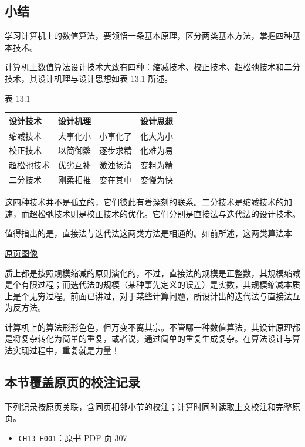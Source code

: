 \documentclass[
  10pt,
  fontset=fandol]{ctexart}
\newcounter{none} %
\providecommand{\tightlist}{%
  \setlength{\itemsep}{0pt}\setlength{\parskip}{0pt}}
\begin{document}
\subsection{小结}\label{ux5c0fux7ed3}

学习计算机上的数值算法，要领悟一条基本原理，区分两类基本方法，掌握四种基本技术。

计算机上数值算法设计技术大致有四种：缩减技术、校正技术、超松弛技术和二分技术，其设计机理与设计思想如表 13.1 所述。

表 13.1

{\def\LTcaptype{none} %
\begin{longtable}[]{@{}lll@{}}
\toprule\noalign{}
设计技术 & 设计机理 & 设计思想 \\
\midrule\noalign{}
\endhead
\bottomrule\noalign{}
\endlastfoot
缩减技术 & 大事化小　小事化了 & 化大为小 \\
校正技术 & 以简御繁　逐步求精 & 化难为易 \\
超松弛技术 & 优劣互补　激浊扬清 & 变粗为精 \\
二分技术 & 刚柔相推　变在其中 & 变慢为快 \\
\end{longtable}
}

这四种技术并不是孤立的，它们彼此有着深刻的联系。二分技术是缩减技术的加速，而超松弛技术则是校正技术的优化。它们分别是直接法与迭代法的设计技术。

值得指出的是，直接法与迭代法这两类方法是相通的。如前所述，这两类算法本

\href{../../source-images/pdf-317.jpeg}{原页图像}

质上都是按照规模缩减的原则演化的，不过，直接法的规模是正整数，其规模缩减是个有限过程；而迭代法的规模（某种事先定义的误差）是实数，其规模缩减本质上是个无穷过程。前面已讲过，对于某些计算问题，所设计出的迭代法与直接法互为反方法。

计算机上的算法形形色色，但万变不离其宗。不管哪一种数值算法，其设计原理都是将复杂转化为简单的重复，或者说，通过简单的重复生成复杂。在算法设计与算法实现过程中，重复就是力量！

\subsection{本节覆盖原页的校注记录}\label{ux672cux8282ux8986ux76d6ux539fux9875ux7684ux6821ux6ce8ux8bb0ux5f55}

下列记录按原页关联，含同页相邻小节的校注；计算时同时读取上文校注和完整原页。

\begin{itemize}
\tightlist
\item
  \texttt{CH13-E001}：原书 PDF 页 307
\end{itemize}
\end{document}
